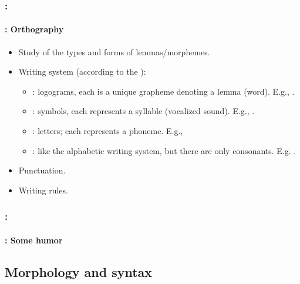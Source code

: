 \documentclass[xcolor=table]{beamer}
\begin{document}
\begin{frame}
	\frametitle{\insertshortsubtitle: \insertsection}
	\framesubtitle{\insertsubsection: Orthography}

	\begin{itemize}
		\item Study of the types and forms of lemmas/morphemes.
		\item Writing system (according to the ): 
		\begin{itemize}
			\item {}: logograms, each is a unique grapheme denoting a lemma (word).
			E.g., .
			\item {}: symbols, each represents a syllable (vocalized sound).
			E.g., .
			\item {}: letters; each represents a phoneme.
			E.g., 
			\item {}: like the alphabetic writing system, but there are only consonants. 
			E.g. .
		\end{itemize}
		\item Punctuation.
		\item Writing rules.
	\end{itemize}

\end{frame}

\begin{frame}
	\frametitle{\insertshortsubtitle: \insertsection}
	\framesubtitle{\insertsubsection: Some humor}

	\begin{center}
	\end{center}

\end{frame}

\subsection{Morphology and syntax}
\end{document}
